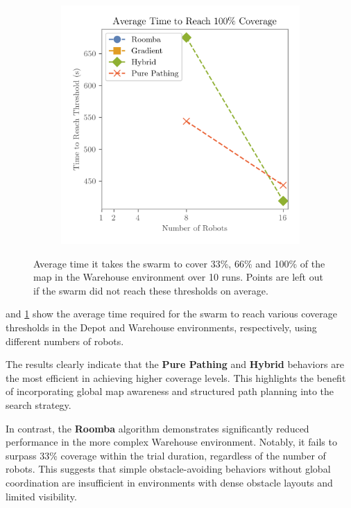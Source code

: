 \begin{figure}[H]
\begin{subfigure}[b]{\w}
    \end{subfigure}
    \begin{subfigure}[b]{\w}
        \centering
        \includegraphics[width=\textwidth]{figures/plots/benchmarks/big-coverage-1.0-warehouse.png}
    \end{subfigure}
    \caption{Average time it takes the swarm to cover 33\%, 66\% and 100\% of the map in the Warehouse environment over 10 runs. Points are left out if the swarm did not reach these thresholds on average.}
    \label{fig:warehouse-threshold}
\end{figure}

 and \cref{fig:warehouse-threshold} show the average time required for the swarm to reach various coverage thresholds in the Depot and Warehouse environments, respectively, using different numbers of robots.

The results clearly indicate that the \textbf{Pure Pathing} and \textbf{Hybrid} behaviors are the most efficient in achieving higher coverage levels. This highlights the benefit of incorporating global map awareness and structured path planning into the search strategy.

In contrast, the \textbf{Roomba} algorithm demonstrates significantly reduced performance in the more complex Warehouse environment. Notably, it fails to surpass 33\% coverage within the trial duration, regardless of the number of robots. This suggests that simple obstacle-avoiding behaviors without global coordination are insufficient in environments with dense obstacle layouts and limited visibility.

